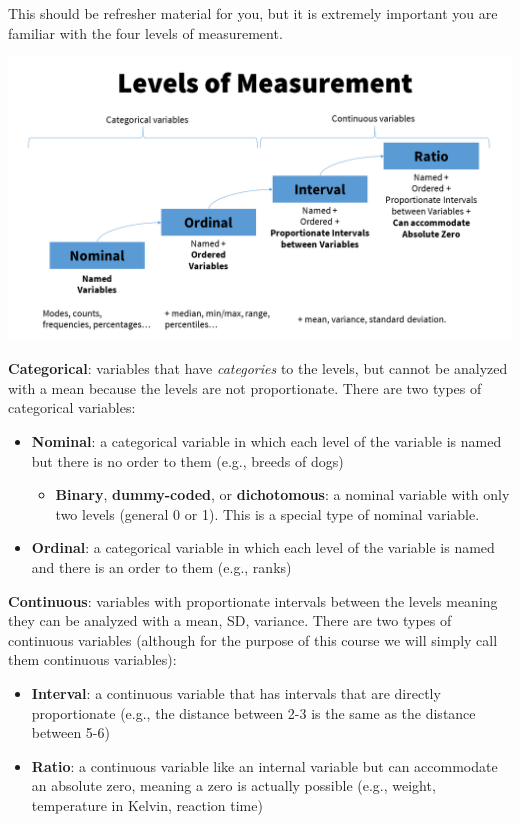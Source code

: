 \documentclass[
]{book}
\providecommand{\tightlist}{%
  \setlength{\itemsep}{0pt}\setlength{\parskip}{0pt}}
\begin{document}
This should be refresher material for you, but it is extremely important you are familiar with the four levels of measurement.

\includegraphics{images/01-intro/Levels of measurement.png}

\textbf{Categorical}: variables that have \emph{categories} to the levels, but cannot be analyzed with a mean because the levels are not proportionate. There are two types of categorical variables:

\begin{itemize}
\item
  \textbf{Nominal}: a categorical variable in which each level of the variable is named but there is no order to them (e.g., breeds of dogs)

  \begin{itemize}
  \tightlist
  \item
    \textbf{Binary}, \textbf{dummy-coded}, or \textbf{dichotomous}: a nominal variable with only two levels (general 0 or 1). This is a special type of nominal variable.
  \end{itemize}
\item
  \textbf{Ordinal}: a categorical variable in which each level of the variable is named and there is an order to them (e.g., ranks)
\end{itemize}

\textbf{Continuous}: variables with proportionate intervals between the levels meaning they can be analyzed with a mean, SD, variance. There are two types of continuous variables (although for the purpose of this course we will simply call them continuous variables):

\begin{itemize}
\item
  \textbf{Interval}: a continuous variable that has intervals that are directly proportionate (e.g., the distance between 2-3 is the same as the distance between 5-6)
\item
  \textbf{Ratio}: a continuous variable like an internal variable but can accommodate an absolute zero, meaning a zero is actually possible (e.g., weight, temperature in Kelvin, reaction time)
\end{itemize}
\end{document}
